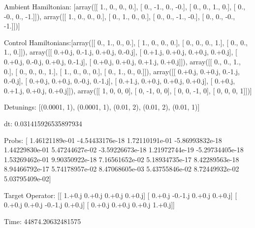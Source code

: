 \documentclass{article}
\begin{document}
    

\newpage

Ambient Hamiltonian: [array([[ 1.,  0.,  0.,  0.],
       [ 0., -1.,  0., -0.],
       [ 0.,  0.,  1.,  0.],
       [ 0., -0.,  0., -1.]]), array([[ 1.,  0.,  0.,  0.],
       [ 0.,  1.,  0.,  0.],
       [ 0.,  0., -1., -0.],
       [ 0.,  0., -0., -1.]])]

Control Hamiltonians:[array([[ 0.,  1.,  0.,  0.],
       [ 1.,  0.,  0.,  0.],
       [ 0.,  0.,  0.,  1.],
       [ 0.,  0.,  1.,  0.]]), array([[ 0.+0.j,  0.-1.j,  0.+0.j,  0.-0.j],
       [ 0.+1.j,  0.+0.j,  0.+0.j,  0.+0.j],
       [ 0.+0.j,  0.-0.j,  0.+0.j,  0.-1.j],
       [ 0.+0.j,  0.+0.j,  0.+1.j,  0.+0.j]]), array([[ 0.,  0.,  1.,  0.],
       [ 0.,  0.,  0.,  1.],
       [ 1.,  0.,  0.,  0.],
       [ 0.,  1.,  0.,  0.]]), array([[ 0.+0.j,  0.+0.j,  0.-1.j,  0.-0.j],
       [ 0.+0.j,  0.+0.j,  0.-0.j,  0.-1.j],
       [ 0.+1.j,  0.+0.j,  0.+0.j,  0.+0.j],
       [ 0.+0.j,  0.+1.j,  0.+0.j,  0.+0.j]]), array([[ 1,  0,  0,  0],
       [ 0, -1,  0,  0],
       [ 0,  0, -1,  0],
       [ 0,  0,  0,  1]])]

Detunings: [(0.0001, 1), (0.0001, 1), (0.01, 2), (0.01, 2), (0.01, 1)]

 dt: 0.031415926535897934

Probs: [  1.46121189e-01  -4.54433176e-18   1.72110191e-01  -5.86993832e-18
   1.44229830e-01   5.47244627e-02  -3.59226673e-18   1.21972744e-19
  -5.29734405e-18   1.53269462e-01   9.90350922e-18   7.16561652e-02
   5.18934735e-17   8.42289563e-18   8.94466792e-17   5.74178957e-02
   8.47068605e-03   5.43755846e-02   8.72449932e-02   5.03795409e-02]

Target Operator: [[ 1.+0.j  0.+0.j  0.+0.j  0.+0.j]
 [ 0.+0.j -0.-1.j  0.+0.j  0.+0.j]
 [ 0.+0.j  0.+0.j -0.-1.j  0.+0.j]
 [ 0.+0.j  0.+0.j  0.+0.j  1.+0.j]]

Time: 44874.20632481575
\end{document}
